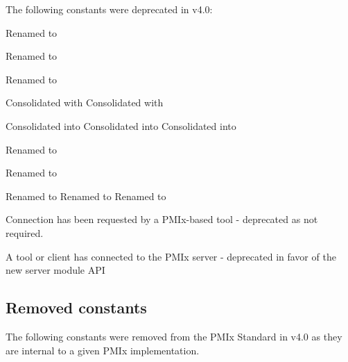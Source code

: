 The following constants were deprecated in v4.0:

\begin{constantdesc}
%
Renamed to 

Renamed to 

%
Renamed to 

%
Consolidated with 
%
Consolidated with 

%
Consolidated into 
%
Consolidated into 
%
Consolidated into 

%
Renamed to 

Renamed to 

%
Renamed to 
%
Renamed to 
%
Renamed to 

%
Connection has been requested by a PMIx-based tool - deprecated as
not required.

A tool or client has connected to the \ac{PMIx} server - deprecated in
favor of the new  server
module \ac{API}

\end{constantdesc}

\subsection{Removed constants}

The following constants were removed from the \ac{PMIx} Standard in v4.0
as they are internal to a given \ac{PMIx} implementation.

